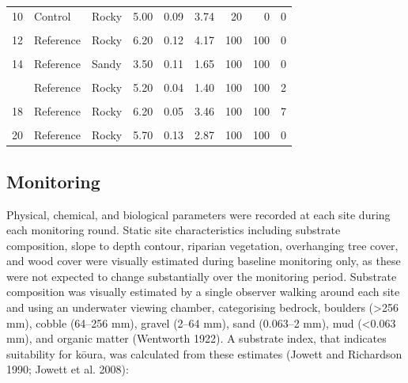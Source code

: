 \documentclass[
  12pt,
  a4paper,
  oneside]{scrbook}
\begin{document}
\begin{longtable}[t]{rllrrrrrr}
10 & Control & Rocky & 5.00 & 0.09 & 3.74 & 20 & 0 & 0\\
\addlinespace
\cellcolor{gray!8}{11} & \cellcolor{gray!8}{Reference} & \cellcolor{gray!8}{Rocky} & \cellcolor{gray!8}{6.60} & \cellcolor{gray!8}{0.16} & \cellcolor{gray!8}{4.47} & \cellcolor{gray!8}{0} & \cellcolor{gray!8}{0} & \cellcolor{gray!8}{0}\\
12 & Reference & Rocky & 6.20 & 0.12 & 4.17 & 100 & 100 & 0\\
\cellcolor{gray!8}{13} & \cellcolor{gray!8}{Reference} & \cellcolor{gray!8}{Sandy} & \cellcolor{gray!8}{3.60} & \cellcolor{gray!8}{0.09} & \cellcolor{gray!8}{1.71} & \cellcolor{gray!8}{100} & \cellcolor{gray!8}{100} & \cellcolor{gray!8}{0}\\
14 & Reference & Sandy & 3.50 & 0.11 & 1.65 & 100 & 100 & 0\\
\cellcolor{gray!8}{15} & \cellcolor{gray!8}{Reference} & \cellcolor{gray!8}{Rocky} & \cellcolor{gray!8}{5.20} & \cellcolor{gray!8}{0.03} & \cellcolor{gray!8}{1.44} & \cellcolor{gray!8}{100} & \cellcolor{gray!8}{100} & \cellcolor{gray!8}{6}\\
\addlinespace
16 & Reference & Rocky & 5.20 & 0.04 & 1.40 & 100 & 100 & 2\\
\cellcolor{gray!8}{17} & \cellcolor{gray!8}{Reference} & \cellcolor{gray!8}{Rocky} & \cellcolor{gray!8}{5.00} & \cellcolor{gray!8}{0.05} & \cellcolor{gray!8}{3.47} & \cellcolor{gray!8}{100} & \cellcolor{gray!8}{100} & \cellcolor{gray!8}{30}\\
18 & Reference & Rocky & 6.20 & 0.05 & 3.46 & 100 & 100 & 7\\
\cellcolor{gray!8}{19} & \cellcolor{gray!8}{Reference} & \cellcolor{gray!8}{Rocky} & \cellcolor{gray!8}{5.70} & \cellcolor{gray!8}{0.11} & \cellcolor{gray!8}{2.63} & \cellcolor{gray!8}{100} & \cellcolor{gray!8}{100} & \cellcolor{gray!8}{4}\\
20 & Reference & Rocky & 5.70 & 0.13 & 2.87 & 100 & 100 & 0\\
\bottomrule

\end{longtable}

\endgroup{}

\subsection{Monitoring}\label{monitoring}

Physical, chemical, and biological parameters were recorded at each site
during each monitoring round. Static site characteristics including
substrate composition, slope to depth contour, riparian vegetation,
overhanging tree cover, and wood cover were visually estimated during
baseline monitoring only, as these were not expected to change
substantially over the monitoring period. Substrate composition was
visually estimated by a single observer walking around each site and
using an underwater viewing chamber, categorising bedrock, boulders
(\textgreater256 mm), cobble (64--256 mm), gravel (2--64 mm), sand
(0.063--2 mm), mud (\textless0.063 mm), and organic matter (Wentworth
1922). A substrate index, that indicates suitability for kōura, was
calculated from these estimates (Jowett and Richardson 1990; Jowett et
al. 2008):
\end{document}
